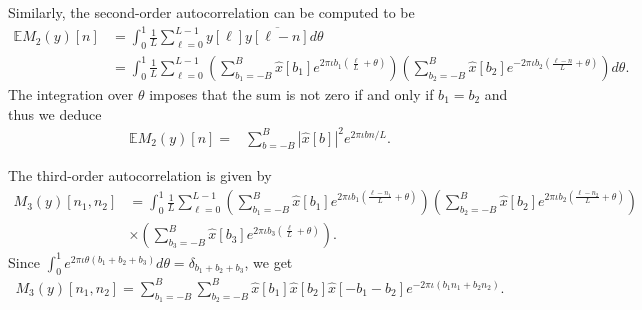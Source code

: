 \documentclass[english,12pt]{article}
\newcommand{\I}{\iota}
\newcommand{\tB}{B}
\newcommand{\E}{\mathbb{E}}
\numberwithin{equation}{section}
\numberwithin{thm}{section} %
\begin{document}
Similarly, the second-order autocorrelation can be computed to be 
\begin{equation}
\begin{split}
\E M_2(y)[n] &= 
\int_{0}^1 \frac{1}{L} \sum_{\ell=0}^{L-1} y[\ell] \overline{y[\ell-n]} d\theta  \\ &=
 \int_{0}^1 \frac{1}{L} \sum_{\ell=0}^{L-1} 
\left(\sum_{b_1=-\tB}^{\tB}\hat{x}[b_1]e^{2\pi\I b _1\left(\frac{\ell}{L} + \theta\right) }\right) \left(\sum_{b_2=-\tB}^{\tB}\hat{x}[b_2]e^{-2\pi\I b_2\left(\frac{\ell-n}{L} + \theta\right) }\right) d\theta. 
\end{split}
\end{equation}
The integration over $\theta$ imposes that the sum is not zero if and only if $b_1=b_2$ and thus we deduce
\begin{equation}
\begin{split}
\E M_2(y)[n]  =
&  \sum_{b=-\tB}^{\tB}|\hat{x}[b]|^2e^{2\pi\I bn/L}. 
\end{split}
\end{equation}

The third-order autocorrelation is given by 
\begin{equation}
\begin{split}
M_3(y)[n_1,n_2] 
&= \int_{0}^{1}\frac{1}{L}\sum_{\ell=0}^{L-1} 
\left(\sum_{b_1=-\tB}^{\tB}\hat{x}[b_1]e^{2\pi\I b_1 \left(\frac{\ell-n_1}{L} + \theta\right) }\right) 
\left(\sum_{b_2=-\tB}^{\tB}\hat{x}[b_2]e^{2\pi\I b_2 \left(\frac{\ell-n_2}{L} + \theta\right) } \right) \\
&\times \left(\sum_{b_3=-\tB}^{\tB}\hat{x}[b_3]e^{2\pi\I b_3 \left(\frac{\ell}{L} + \theta\right) }\right). 
\end{split}
\end{equation}
Since $\int_{0}^{1}e^{2\pi\I\theta(b_1+b_2+b_3)}d\theta=\delta_{b_1+b_2+b_3}$, we get 
\begin{equation}
\begin{split}
M_3(y)[n_1,n_2] =   \sum_{b_1=-\tB}^{\tB}\sum_{b_2=-\tB}^{\tB} \hat{x}[b_1]\hat{x}[b_2]\hat{x}[-b_1-b_2]e^{-2\pi\I (b_1n_1+b_2n_2)}.
\end{split}
\end{equation}
\end{document}
